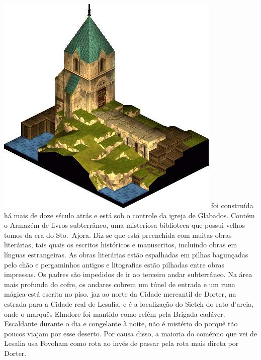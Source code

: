 \includegraphics[width=\columnwidth]{./art/worldbook/orbonne.jpg}
\ofpar
%
 foi construída há mais de doze século atrás e está sob o controle da igreja de Glabados.
Contém o Armazém de livros subterrâneo, uma misteriosa biblioteca que possui velhos tomos da era do Sto.~Ajora.
Diz-se que está preenchida com muitas obras literárias, tais quais os escritos históricos e manuscritos, incluindo obras em línguas estrangeiras.
As obras literárias estão espalhadas em pilhas bagunçadas pelo chão e pergaminhos antigos e litografias estão pilhadas entre obras impressas.
Os padres são impedidos de ir ao terceiro andar subterrâneo.
Na área mais profunda do cofre, os andares cobrem um túnel de entrada e um runa mágica está escrita no piso.
 jaz ao norte da Cidade mercantil de Dorter, na estrada para a Cidade real de Lesalia, e é a localização do Sietch do rato d'areia, onde o marquês Elmdore foi mantido como refém pela Brigada cadáver.
Escaldante durante o dia e congelante à noite, não é mistério do porquê tão poucos viajam por esse deserto. Por causa disso, a maioria do comércio que vei de Lesalia usa Fovoham como rota ao invés de passar pela rota mais direta por Dorter.
%
\vfill
